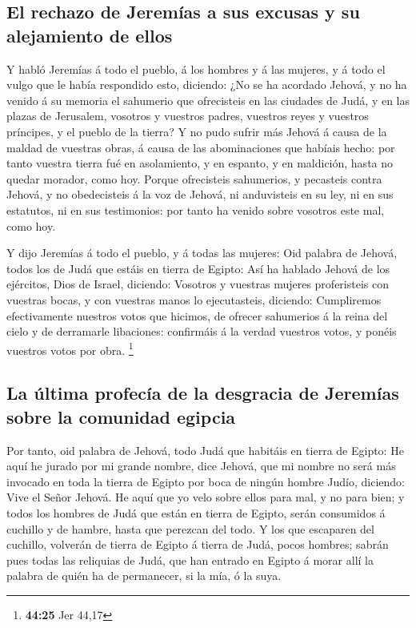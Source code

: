 \hypertarget{el-rechazo-de-jeremuxedas-a-sus-excusas-y-su-alejamiento-de-ellos}{%
\subsection{El rechazo de Jeremías a sus excusas y su alejamiento de
ellos}\label{el-rechazo-de-jeremuxedas-a-sus-excusas-y-su-alejamiento-de-ellos}}

 Y habló Jeremías á todo el pueblo, á los hombres y á las
mujeres, y á todo el vulgo que le había respondido esto, diciendo:
 ¿No se ha acordado Jehová, y no ha venido á su memoria
el sahumerio que ofrecisteis en las ciudades de Judá, y en las plazas de
Jerusalem, vosotros y vuestros padres, vuestros reyes y vuestros
príncipes, y el pueblo de la tierra?  Y no pudo sufrir
más Jehová á causa de la maldad de vuestras obras, á causa de las
abominaciones que habíais hecho: por tanto vuestra tierra fué en
asolamiento, y en espanto, y en maldición, hasta no quedar morador, como
hoy.  Porque ofrecisteis sahumerios, y pecasteis contra
Jehová, y no obedecisteis á la voz de Jehová, ni anduvisteis en su ley,
ni en sus estatutos, ni en sus testimonios: por tanto ha venido sobre
vosotros este mal, como hoy.

 Y dijo Jeremías á todo el pueblo, y á todas las mujeres:
Oid palabra de Jehová, todos los de Judá que estáis en tierra de Egipto:
 Así ha hablado Jehová de los ejércitos, Dios de Israel,
diciendo: Vosotros y vuestras mujeres proferisteis con vuestras bocas, y
con vuestras manos lo ejecutasteis, diciendo: Cumpliremos efectivamente
nuestros votos que hicimos, de ofrecer sahumerios á la reina del cielo y
de derramarle libaciones: confirmáis á la verdad vuestros votos, y
ponéis vuestros votos por obra. \footnote{\textbf{44:25} Jer 44,17}

\hypertarget{la-uxfaltima-profecuxeda-de-la-desgracia-de-jeremuxedas-sobre-la-comunidad-egipcia}{%
\subsection{La última profecía de la desgracia de Jeremías sobre la
comunidad
egipcia}\label{la-uxfaltima-profecuxeda-de-la-desgracia-de-jeremuxedas-sobre-la-comunidad-egipcia}}

 Por tanto, oid palabra de Jehová, todo Judá que habitáis
en tierra de Egipto: He aquí he jurado por mi grande nombre, dice
Jehová, que mi nombre no será más invocado en toda la tierra de Egipto
por boca de ningún hombre Judío, diciendo: Vive el Señor Jehová.
 He aquí que yo velo sobre ellos para mal, y no para
bien; y todos los hombres de Judá que están en tierra de Egipto, serán
consumidos á cuchillo y de hambre, hasta que perezcan del todo.
 Y los que escaparen del cuchillo, volverán de tierra de
Egipto á tierra de Judá, pocos hombres; sabrán pues todas las reliquias
de Judá, que han entrado en Egipto á morar allí la palabra de quién ha
de permanecer, si la mía, ó la suya.

